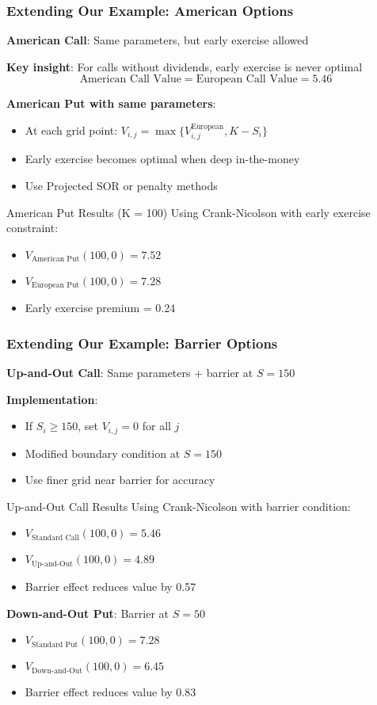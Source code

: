 \documentclass[aspectratio=169]{beamer}
\begin{document}
\begin{frame}
\frametitle{Extending Our Example: American Options}
\textbf{American Call}: Same parameters, but early exercise allowed

\textbf{Key insight}: For calls without dividends, early exercise is never optimal
\[\text{American Call Value} = \text{European Call Value} = 5.46\]

\textbf{American Put with same parameters}:
\begin{itemize}
\item At each grid point: \(V_{i,j} = \max\{V_{i,j}^{\text{European}}, K - S_i\}\)
\item Early exercise becomes optimal when deep in-the-money
\item Use Projected SOR or penalty methods
\end{itemize}

\begin{block}{American Put Results (K = 100)}
Using Crank-Nicolson with early exercise constraint:
\begin{itemize}
\item \(V_{\text{American Put}}(100, 0) = 7.52\)
\item \(V_{\text{European Put}}(100, 0) = 7.28\)
\item Early exercise premium = 0.24
\end{itemize}
\end{block}
\end{frame}

\begin{frame}
\frametitle{Extending Our Example: Barrier Options}
\textbf{Up-and-Out Call}: Same parameters + barrier at \(S = 150\)

\textbf{Implementation}:
\begin{itemize}
\item If \(S_i \geq 150\), set \(V_{i,j} = 0\) for all \(j\)
\item Modified boundary condition at \(S = 150\)
\item Use finer grid near barrier for accuracy
\end{itemize}

\begin{block}{Up-and-Out Call Results}
Using Crank-Nicolson with barrier condition:
\begin{itemize}
\item \(V_{\text{Standard Call}}(100, 0) = 5.46\)
\item \(V_{\text{Up-and-Out}}(100, 0) = 4.89\)
\item Barrier effect reduces value by 0.57
\end{itemize}
\end{block}

\textbf{Down-and-Out Put}: Barrier at \(S = 50\)
\begin{itemize}
\item \(V_{\text{Standard Put}}(100, 0) = 7.28\)
\item \(V_{\text{Down-and-Out}}(100, 0) = 6.45\)
\item Barrier effect reduces value by 0.83
\end{itemize}
\end{frame}
\end{document}
